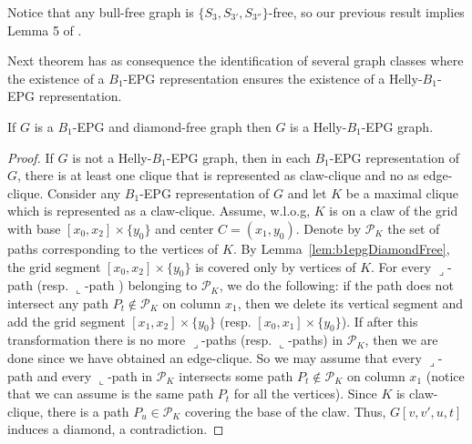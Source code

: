 


Notice that any bull-free graph is $\{S_{3}, S_{3'}, S_{3''}\}$-free, so our previous result implies  Lemma 5 of  \cite{ries2009}.






Next theorem has as consequence the identification of several graph classes where the existence of a $B_1$-EPG representation ensures the existence of a Helly-$B_1$-EPG representation.


\begin{theorem} \label{lem:b1DiamondFree}
 If $G$ is a $B_1$-EPG and diamond-free graph then $G$ is a Helly-$B_1$-EPG graph.
 \end{theorem}

\begin{proof}
If $G$ is not a Helly-$B_1$-EPG graph, then in each $B_1$-EPG representation of $G$, there is at least one clique that is represented as claw-clique and no as edge-clique.  Consider any $B_1$-EPG  representation of $G$  and let $K$ be a maximal clique  which is represented as a claw-clique. Assume, w.l.o.g,  $K$ is on a claw of the grid with base $[x_0, x_2]\times\{y_0\}$ and center $C = (x_1, y_0)$. Denote by  $\mathcal{P}_K$ the set of paths corresponding to the vertices of $K$. 
 By Lemma~\ref{lem:b1epgDiamondFree},  %
the grid segment $[x_0, x_2]\times\{y_0\}$ is covered only by vertices of $K$. %
 For every ${\displaystyle \lrcorner}$-path %
 (resp. ${\displaystyle \llcorner}$-path 
 ) belonging to $\mathcal{P}_K$, we do the following: if %
 the path does not intersect any path $P_t \notin\mathcal{P}_K$ on column $x_1$, then we delete its vertical segment and add the grid segment $[x_1, x_2]\times\{y_0\}$ (resp. $[x_0, x_1]\times\{y_0\}$). If after this transformation there is no more ${\displaystyle \lrcorner}$-paths (resp. ${\displaystyle \llcorner}$-paths) in $\mathcal{P}_K$, then we are done since we have obtained an edge-clique. So we may assume that
 every ${\displaystyle \lrcorner}$-path   and every ${\displaystyle \llcorner}$-path  in $ \mathcal{P}_K$ intersects some path $P_t \notin \mathcal{P}_K$   on column $x_1$ (notice that we can assume is the same path $P_t$ for all the vertices). Since  $K$ is claw-clique,  there is a path $P_u \in \mathcal{P}_K$ covering the base of the claw. Thus, $G[v, v', u, t]$ induces a diamond,  a contradiction. 
\end{proof}  


